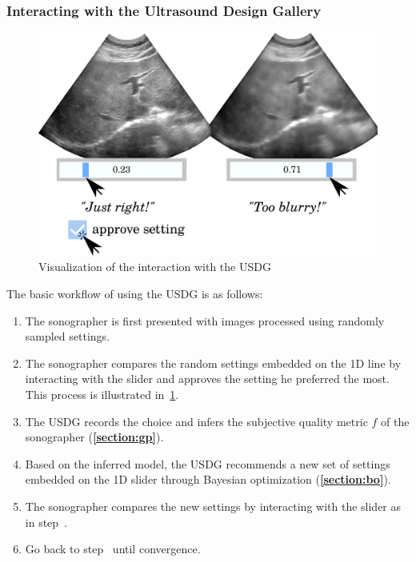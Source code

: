 \subsubsection{Interacting with the Ultrasound Design Gallery}
%
\begin{figure}[h]
  \centering
  \includegraphics[scale=0.3]{figures/ui_interaction.pdf}
  \caption{Visualization of the interaction with the USDG}\label{fig:interaction}
\end{figure}
%
The basic workflow of using the USDG is as follows:
\begin{enumerate}
\item[\ding{182}] The sonographer is first presented with images processed using randomly sampled settings.
\item[\ding{183}] The sonographer compares the random settings embedded on the 1D line by interacting with the slider and approves the setting he preferred the most. This process is illustrated in~\cref{fig:interaction}.
\item[\ding{184}] The USDG records the choice and infers the subjective quality metric \(f\) of the sonographer (\textbf{\cref{section:gp}}).
\item[\ding{185}] Based on the inferred model, the USDG recommends a new set of settings embedded on the 1D slider through Bayesian optimization (\textbf{\cref{section:bo}}).
\item[\ding{186}] The sonographer compares the new settings by interacting with the slider as in step~.
\item[\ding{187}] Go back to step~ until convergence.
\end{enumerate}

